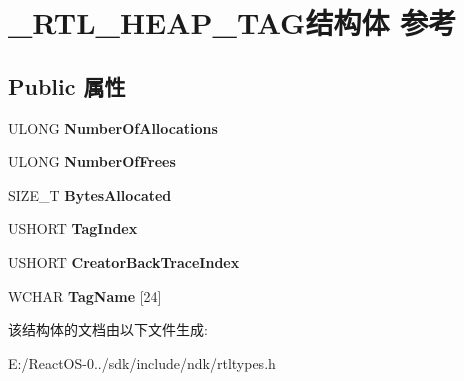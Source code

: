 \hypertarget{struct___r_t_l___h_e_a_p___t_a_g}{}\section{\+\_\+\+R\+T\+L\+\_\+\+H\+E\+A\+P\+\_\+\+T\+A\+G结构体 参考}
\label{struct___r_t_l___h_e_a_p___t_a_g}
\subsection*{Public 属性}
\begin{DoxyCompactItemize}
\item 
\mbox{\label{struct___r_t_l___h_e_a_p___t_a_g_afbb3129f26eb8190d84d61d2d061a07a}} 
U\+L\+O\+NG {\bfseries Number\+Of\+Allocations}
\item 
\mbox{\label{struct___r_t_l___h_e_a_p___t_a_g_a9bd212da8b8760b3b69e4329ca2db139}} 
U\+L\+O\+NG {\bfseries Number\+Of\+Frees}
\item 
\mbox{\label{struct___r_t_l___h_e_a_p___t_a_g_a7f17fa4cfeaf105a396e6c3cfea82c7b}} 
S\+I\+Z\+E\+\_\+T {\bfseries Bytes\+Allocated}
\item 
\mbox{\label{struct___r_t_l___h_e_a_p___t_a_g_a292fc7f7a2916f82c801b38f64714776}} 
U\+S\+H\+O\+RT {\bfseries Tag\+Index}
\item 
\mbox{\label{struct___r_t_l___h_e_a_p___t_a_g_a82deebd1af185a32d6c74c0e22b9f014}} 
U\+S\+H\+O\+RT {\bfseries Creator\+Back\+Trace\+Index}
\item 
\mbox{\label{struct___r_t_l___h_e_a_p___t_a_g_ae485d7f0cb9e3a95edb1252cb738d582}} 
W\+C\+H\+AR {\bfseries Tag\+Name} \mbox{[}24\mbox{]}
\end{DoxyCompactItemize}


该结构体的文档由以下文件生成\+:\begin{DoxyCompactItemize}
\item 
E\+:/\+React\+O\+S-\/0../sdk/include/ndk/rtltypes.\+h\end{DoxyCompactItemize}

